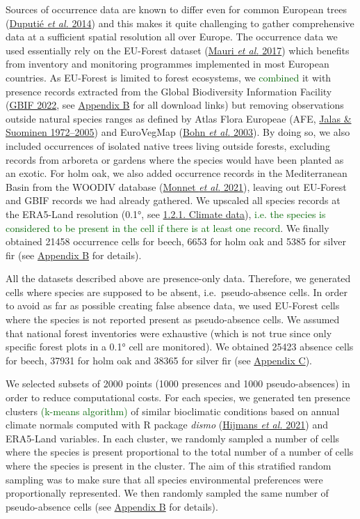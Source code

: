 \documentclass[11pt,]{article}
\begin{document}
Sources of occurrence data are known to differ even for common European
trees (\protect\hyperlink{ref-Duputie2014}{Duputié \emph{et al.} 2014})
and this makes it quite challenging to gather comprehensive data at a
sufficient spatial resolution all over Europe. The occurrence data we
used essentially rely on the EU-Forest dataset
(\protect\hyperlink{ref-Mauri2017}{Mauri \emph{et al.} 2017}) which
benefits from inventory and monitoring programmes implemented in most
European countries. As EU-Forest is limited to forest ecosystems, we
\textcolor{darkgreen}{combined} it with presence records extracted from
the Global Biodiversity Information Facility
(\protect\hyperlink{ref-GBIF2022}{GBIF 2022}, see
\protect\hyperlink{appendixB}{Appendix B} for all download links) but
removing observations outside natural species ranges as defined by Atlas
Flora Europeae (AFE, \protect\hyperlink{ref-AFE2005}{Jalas \& Suominen
1972--2005}) and EuroVegMap (\protect\hyperlink{ref-EVM2003}{Bohn
\emph{et al.} 2003}). By doing so, we also included occurrences of
isolated native trees living outside forests, excluding records from
arboreta or gardens where the species would have been planted as an
exotic. For holm oak, we also added occurrence records in the
Mediterranean Basin from the WOODIV database
(\protect\hyperlink{ref-Monnet2021}{Monnet \emph{et al.} 2021}), leaving
out EU-Forest and GBIF records we had already gathered. We upscaled all
species records at the ERA5-Land resolution (0.1°, see
\protect\hyperlink{climatedata}{1.2.1. Climate data}),
\textcolor{darkgreen}{i.e. the species is considered to be present in the cell if there is at least one record}.
We finally obtained 21458 occurrence cells for beech, 6653 for holm oak
and 5385 for silver fir (see \protect\hyperlink{appendixB}{Appendix B}
for details).

All the datasets described above are presence-only data. Therefore, we
generated cells where species are supposed to be absent,
i.e.~pseudo-absence cells. In order to avoid as far as possible creating
false absence data, we used EU-Forest cells where the species is not
reported present as pseudo-absence cells. We assumed that national
forest inventories were exhaustive (which is not true since only
specific forest plots in a 0.1° cell are monitored). We obtained 25423
absence cells for beech, 37931 for holm oak and 38365 for silver fir
(see \protect\hyperlink{appendixC}{Appendix C}).

We selected subsets of 2000 points (1000 presences and 1000
pseudo-absences) in order to reduce computational costs. For each
species, we generated ten presence clusters
\textcolor{darkgreen}{(k-means algorithm)} of similar bioclimatic
conditions based on annual climate normals computed with R package
\emph{dismo} (\protect\hyperlink{ref-Hijmans2021}{Hijmans \emph{et al.}
2021}) and ERA5-Land variables. In each cluster, we randomly sampled a
number of cells where the species is present proportional to the total
number of a number of cells where the species is present in the cluster.
The aim of this stratified random sampling was to make sure that all
species environmental preferences were proportionally represented. We
then randomly sampled the same number of pseudo-absence cells (see
\protect\hyperlink{appendixB}{Appendix B} for details).
\end{document}
